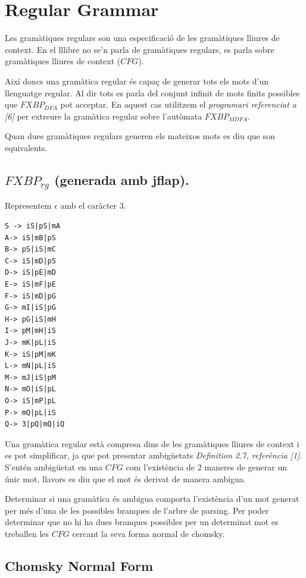 \documentclass[12pt,a4paper]{report}
\def \dfa{$FXBP_{DFA} $}
\def \mfa{$FXBP_{MDFA} $}
\def \rg{$FXBP_{rg} $}
\def \cfg{$CFG$}
\begin{document}
\section{Regular Grammar}

Les gramàtiques regulars son una especificació de les gramàtiques lliures de context. En el lllibre no se’n parla de gramàtiques regulars, es parla sobre gramàtiques lliures de context (\cfg{}). 

Així doncs una gramàtica regular és capaç de generar tots els mots d’un llenguatge regular. Al dir tots es parla del conjunt infinit de mots finits possibles que \dfa{} pot acceptar. En aquest cas utilitzem el \textit{programari referenciat a [6]} per extreure la gramàtica regular sobre l’autòmata \mfa{}. 

\begin{center}
Quan dues gramàtiques regulars generen els mateixos mots es diu que son equivalents.
\end{center}

\subsection{\rg{} (generada amb jflap).}

Representem $\epsilon$ amb el caràcter 3. 

\begin{lstlisting}
S -> iS|pS|mA
A-> iS|mB|pS
B-> pS|iS|mC
C-> iS|mD|pS
D-> iS|pE|mD
E-> iS|mF|pE
F-> iS|mD|pG
G-> mI|iS|pG
H-> pG|iS|mH
I-> pM|mH|iS
J-> mK|pL|iS
K-> iS|pM|mK
L-> mN|pL|iS
M-> mJ|iS|pM
N-> mO|iS|pL
O-> iS|mP|pL
P-> mQ|pL|iS
Q-> 3|pQ|mQ|iQ
\end{lstlisting}

Una gramàtica regular està compresa dins de les gramàtiques lliures de context i es pot simplificar, ja que pot presentar ambigüetats \textit{Definition 2.7, referència [1]}. S’entén ambigüetat en una $CFG$ com l’existència de 2 maneres de generar un únic mot, llavors es diu que el mot és derivat de manera ambigua.

Determinar si una gramàtica és ambigua comporta l’existència d’un mot generat per més d’una de les possibles branques de l’arbre de parsing. Per poder determinar que no hi ha dues branques possibles per un determinat mot es treballen les $CFG$ cercant la seva forma normal de chomsky. 

\subsection{Chomsky Normal Form}
\end{document}
